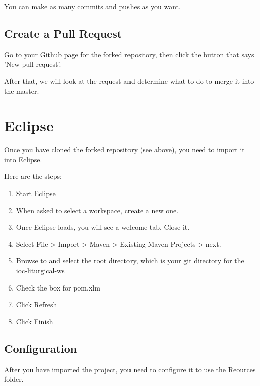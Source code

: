 \documentclass[]{memoir}
\def\iocWs{ioc-liturgical-ws }%
\begin{document}
\begin{bash}
\end{bash}

You can make as many commits and pushes as you want. 

\section{Create a Pull Request}

Go to your Github page for the forked repository, then click the button that says 'New pull request'.  

After that, we will look at the request and determine what to do to merge it into the master.

\chapter{Eclipse}

Once you have cloned the forked repository (see above), you need to import it into Eclipse.

Here are the steps:

\begin{enumerate}
    \item{Start Eclipse}
    \item{When asked to select a workspace, create a new one.}
    \item{Once Eclipse loads, you will see a welcome tab.  Close it.}
    \item{Select File > Import > Maven > Existing Maven Projects > next.}
    \item{Browse to and select the root directory, which is your git directory for the \iocWs}
    \item{Check the box for pom.xlm}
    \item{Click Refresh}
    \item{Click Finish}
\end{enumerate}

\section{Configuration}

After you have imported the project, you need to configure it to use the Reources folder.
\end{document}
